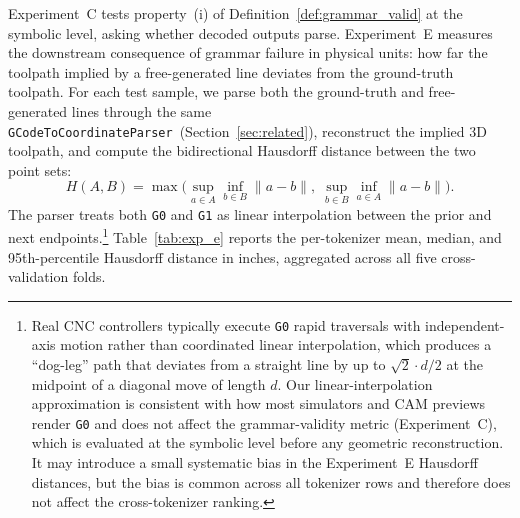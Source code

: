 \documentclass[sensors,article,submit,moreauthors,pdftex]{Definitions/mdpi}
\begin{document}
Experiment~C tests property~(i) of Definition~\ref{def:grammar_valid} at the symbolic level, asking whether decoded outputs parse. Experiment~E measures the downstream consequence of grammar failure in physical units: how far the toolpath implied by a free-generated line deviates from the ground-truth toolpath. For each test sample, we parse both the ground-truth and free-generated lines through the same \texttt{GCodeToCoordinateParser}~(Section~\ref{sec:related}), reconstruct the implied 3D toolpath, and compute the bidirectional Hausdorff distance between the two point sets:
\[
H(A, B) = \max\!\Big(\sup_{a \in A}\inf_{b \in B}\|a-b\|,\;\sup_{b \in B}\inf_{a \in A}\|a-b\|\Big).
\]
The parser treats both \texttt{G0} and \texttt{G1} as linear interpolation between the prior and next endpoints.\footnote{Real CNC controllers typically execute \texttt{G0} rapid traversals with independent-axis motion rather than coordinated linear interpolation, which produces a ``dog-leg'' path that deviates from a straight line by up to $\sqrt{2}\cdot d/2$ at the midpoint of a diagonal move of length $d$. Our linear-interpolation approximation is consistent with how most simulators and CAM previews render \texttt{G0} and does not affect the grammar-validity metric (Experiment~C), which is evaluated at the symbolic level before any geometric reconstruction. It may introduce a small systematic bias in the Experiment~E Hausdorff distances, but the bias is common across all tokenizer rows and therefore does not affect the cross-tokenizer ranking.}
Table~\ref{tab:exp_e} reports the per-tokenizer mean, median, and 95th-percentile Hausdorff distance in inches, aggregated across all five cross-validation folds.
\end{document}
